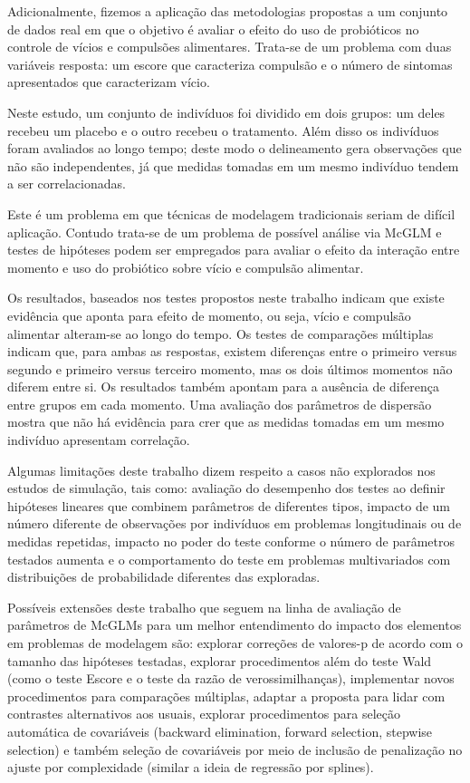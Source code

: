 \documentclass[AMA,STIX1COL]{WileyNJD-v2}
\begin{document}
Adicionalmente, fizemos a aplicação das metodologias propostas a um conjunto de dados real em que o objetivo é avaliar o efeito do uso de probióticos no controle de vícios e compulsões alimentares. Trata-se de um problema com duas variáveis resposta: um escore que caracteriza compulsão e o número de sintomas apresentados que caracterizam vício. 

Neste estudo, um conjunto de indivíduos foi dividido em dois grupos: um deles recebeu um placebo e o outro recebeu o tratamento. Além disso os indivíduos foram avaliados ao longo tempo; deste modo o delineamento gera observações que não são independentes, já que medidas tomadas em um mesmo indivíduo tendem a ser correlacionadas. 

Este é um problema em que técnicas de modelagem tradicionais seriam de difícil aplicação. Contudo trata-se de um problema de possível análise via McGLM e testes de hipóteses podem ser empregados para avaliar o efeito da interação entre momento e uso do probiótico sobre vício e compulsão alimentar.

Os resultados, baseados nos testes propostos neste trabalho indicam que existe evidência que aponta para efeito de momento, ou seja, vício e compulsão alimentar alteram-se ao longo do tempo. Os testes de comparações múltiplas indicam que, para ambas as respostas, existem diferenças entre o primeiro versus segundo e primeiro versus terceiro momento, mas os dois últimos momentos não diferem entre si. Os resultados também apontam para a ausência de diferença entre grupos em cada momento. Uma avaliação dos parâmetros de dispersão mostra que não há evidência para crer que as medidas tomadas em um mesmo indivíduo apresentam correlação.

Algumas limitações deste trabalho dizem respeito a casos não explorados nos estudos de simulação, tais como: avaliação do desempenho dos testes ao definir hipóteses lineares que combinem parâmetros de diferentes tipos, impacto de um número diferente de observações por indivíduos em problemas longitudinais ou de medidas repetidas, impacto no poder do teste conforme o número de parâmetros testados aumenta e o comportamento do teste em problemas multivariados com distribuições de probabilidade diferentes das exploradas.

Possíveis extensões deste trabalho que seguem na linha de avaliação de parâmetros de McGLMs para um melhor entendimento do impacto dos elementos em problemas de modelagem são: explorar correções de valores-p de acordo com o tamanho das hipóteses testadas, explorar procedimentos além do teste Wald (como o teste Escore e o teste da razão de verossimilhanças), implementar novos procedimentos para comparações múltiplas, adaptar a proposta para lidar com contrastes alternativos aos usuais, explorar procedimentos para seleção automática de covariáveis (backward elimination, forward selection, stepwise selection) e também seleção de covariáveis por meio de inclusão de penalização no ajuste por complexidade (similar a ideia de regressão por splines).
\end{document}

